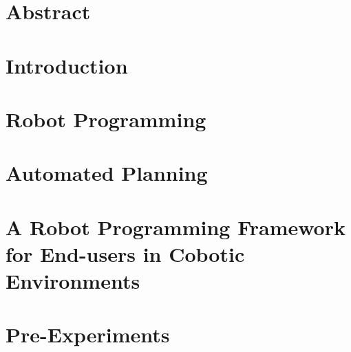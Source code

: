 \documentclass[a4paper,12pt,twoside,openany]{book}
\theoremstyle{definition}
\theoremstyle{remark}
\begin{document}

 \maketitle

%

\chapter*{Abstract}


\dominitoc%
\tableofcontents
\listoffigures


\chapter{Introduction} \label{chap:Intro}
\minitoc%


\chapter{Robot Programming}\label{chap:Sota}
\minitoc%


\chapter{Automated Planning}\label{chap:Sota-AP}
\minitoc%


\chapter{A Robot Programming Framework for End-users in Cobotic Environments}\label{chap:Contribution}
\minitoc%


\chapter{Pre-Experiments}\label{chap:Pre-Experiments}
\minitoc

\end{document}
